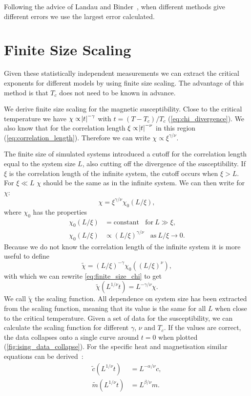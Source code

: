 \documentclass[11pt, a4paper]{report} %
\begin{document}
Following the advice of Landau and Binder~\cite{landau:2015}, when different methods give different errors we use the largest error calculated.


\section{Finite Size Scaling}
Given these statistically independent measurements we can extract the critical exponents for different models by using finite size scaling.
The advantage of this method is that \(T_c\) does not need to be known in advance.

We derive finite size scaling for the magnetic susceptibility.
Close to the critical temperature we have \(\chi \propto \abs{t} ^{-\gamma}\) with \(t = (T-T_c) / T_c\) (\cref{eq:chi_divergence}).
We also know that for the correlation length \(\xi \propto \abs{t}^{-\nu}\) in this region (\cref{eq:correlation_length}).
Therefore we can write \(\chi \propto \xi^{\gamma /\nu}\).

The finite size of simulated systems introduced a cutoff for the correlation length equal to the system size \(L\), also cutting off the divergence of the susceptibility.
If \(\xi\) is the correlation length of the infinite system, the cutoff occurs when \(\xi > L\).
For \(\xi \ll L\) \(\chi\) should be the same as in the infinite system.
We can then write for \(\chi\):
\begin{equation}\label{eq:finite_size_chi}
	\chi = \xi^{\gamma/\nu} \chi_0(L/\xi),
\end{equation}
where \(\chi_0\) has the properties
\begin{align}
	\chi_0(L/\xi) &= \mathrm{constant}\ \ \ \ \mathrm{for}\ L \gg \xi,\\
	\chi_0(L/\xi) &\propto (L/\xi)^{\gamma/\nu}\ \ \ \ \mathrm{as}\ L/\xi \to 0.
\end{align}
Because we do not know the correlation length of the infinite system it is more useful to define
\begin{equation}
	\widetilde{\chi} = (L/\xi)^{-\gamma} \chi_0((L/\xi)^{\nu}),
\end{equation}
with which we can rewrite \cref{eq:finite_size_chi} to get
\begin{equation}
	\widetilde{\chi}(L^{1/\nu}t) = L^{-\gamma/\nu}\chi.
\end{equation}
We call \(\tilde{\chi}\) the scaling function.
All dependence on system size has been extracted from the scaling function, meaning that its value is the same for all \(L\) when close to the critical temperature.
Given a set of data for the susceptibility, we can calculate the scaling function for different \(\gamma\), \(\nu\) and \(T_c\).
If the values are correct, the data collapses onto a single curve around \(t=0\) when plotted (\cref{fig:ising_data_collapse}).
For the specific heat and magnetisation similar equations can be derived~\cite{newman:1999}:
\begin{align}
	\widetilde{c}(L^{1/\nu}t) &= L^{-\alpha/\nu} c, \\
	\widetilde{m}(L^{1/\nu}t) &= L^{\beta/\nu} m.\label{eq:magnetisation_scaling}
\end{align}
\end{document}
